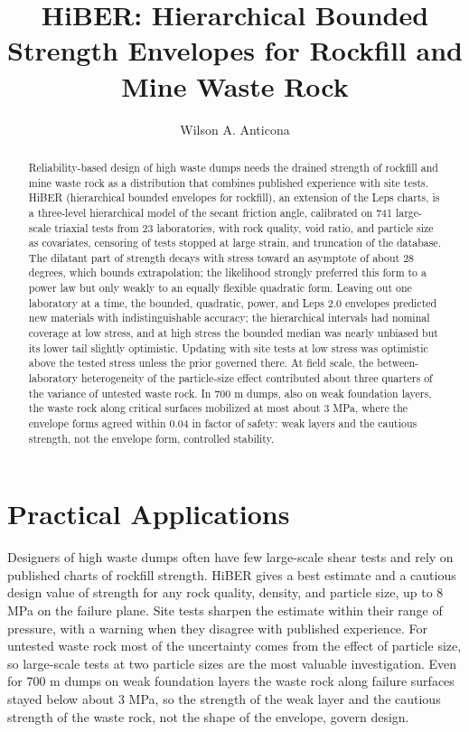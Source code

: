\documentclass[Journal,letterpaper]{ascelike-new}
\begin{document}
\title{HiBER: Hierarchical Bounded Strength Envelopes for Rockfill and Mine Waste Rock}
\author[1]{Wilson A. Anticona}
\maketitle

\begin{abstract}
\noindent Reliability-based design of high waste dumps needs the drained strength of rockfill and mine waste rock as a distribution that combines published experience with site tests. HiBER (hierarchical bounded envelopes for rockfill), an extension of the Leps charts, is a three-level hierarchical model of the secant friction angle, calibrated on 741 large-scale triaxial tests from 23 laboratories, with rock quality, void ratio, and particle size as covariates, censoring of tests stopped at large strain, and truncation of the database. The dilatant part of strength decays with stress toward an asymptote of about 28 degrees, which bounds extrapolation; the likelihood strongly preferred this form to a power law but only weakly to an equally flexible quadratic form. Leaving out one laboratory at a time, the bounded, quadratic, power, and Leps 2.0 envelopes predicted new materials with indistinguishable accuracy; the hierarchical intervals had nominal coverage at low stress, and at high stress the bounded median was nearly unbiased but its lower tail slightly optimistic. Updating with site tests at low stress was optimistic above the tested stress unless the prior governed there. At field scale, the between-laboratory heterogeneity of the particle-size effect contributed about three quarters of the variance of untested waste rock. In 700 m dumps, also on weak foundation layers, the waste rock along critical surfaces mobilized at most about 3 MPa, where the envelope forms agreed within 0.04 in factor of safety: weak layers and the cautious strength, not the envelope form, controlled stability.

\end{abstract}
\section{Practical Applications}
\noindent Designers of high waste dumps often have few large-scale shear tests and rely on published charts of rockfill strength. HiBER gives a best estimate and a cautious design value of strength for any rock quality, density, and particle size, up to 8 MPa on the failure plane. Site tests sharpen the estimate within their range of pressure, with a warning when they disagree with published experience. For untested waste rock most of the uncertainty comes from the effect of particle size, so large-scale tests at two particle sizes are the most valuable investigation. Even for 700 m dumps on weak foundation layers the waste rock along failure surfaces stayed below about 3 MPa, so the strength of the weak layer and the cautious strength of the waste rock, not the shape of the envelope, govern design.
\end{document}
